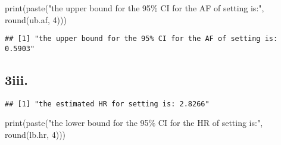 \documentclass[
]{article}
\newenvironment{Shaded}{\begin{snugshade}}{\end{snugshade}}
\newcommand{\CommentTok}[1]{\textcolor[rgb]{0.56,0.35,0.01}{\textit{#1}}}
\newcommand{\DecValTok}[1]{\textcolor[rgb]{0.00,0.00,0.81}{#1}}
\newcommand{\FunctionTok}[1]{\textcolor[rgb]{0.00,0.00,0.00}{#1}}
\newcommand{\NormalTok}[1]{#1}
\newcommand{\OtherTok}[1]{\textcolor[rgb]{0.56,0.35,0.01}{#1}}
\newcommand{\SpecialCharTok}[1]{\textcolor[rgb]{0.00,0.00,0.00}{#1}}
\newcommand{\StringTok}[1]{\textcolor[rgb]{0.31,0.60,0.02}{#1}}
\begin{document}
\begin{Shaded}
\begin{Highlighting}[]
\FunctionTok{print}\NormalTok{(}\FunctionTok{paste}\NormalTok{(}\StringTok{"the upper bound for the 95\% CI for the AF of setting is:"}\NormalTok{, }\FunctionTok{round}\NormalTok{(ub.af,}
    \DecValTok{4}\NormalTok{)))}
\end{Highlighting}
\end{Shaded}

\begin{verbatim}
## [1] "the upper bound for the 95% CI for the AF of setting is: 0.5903"
\end{verbatim}

\hypertarget{iii.}{%
\subsection{3iii.}\label{iii.}}

\begin{Shaded}
\end{Shaded}

\begin{verbatim}
## [1] "the estimated HR for setting is: 2.8266"
\end{verbatim}

\begin{Shaded}
\begin{Highlighting}[]
\FunctionTok{print}\NormalTok{(}\FunctionTok{paste}\NormalTok{(}\StringTok{"the lower bound for the 95\% CI for the HR of setting is:"}\NormalTok{, }\FunctionTok{round}\NormalTok{(lb.hr,}
    \DecValTok{4}\NormalTok{)))}
\end{Highlighting}
\end{Shaded}
\end{document}

